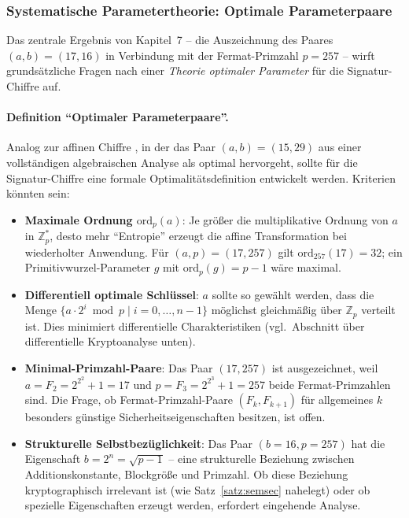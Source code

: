 ﻿\documentclass[a4paper,12pt]{scrreprt}
\theoremstyle{definition}
\begin{document}
\subsubsection{Systematische Parametertheorie: Optimale Parameterpaare}

Das zentrale Ergebnis von Kapitel~7 -- die Auszeichnung des Paares $(a, b) = (17, 16)$ in Verbindung mit der Fermat-Primzahl $p = 257$ -- wirft grundsätzliche Fragen nach einer \emph{Theorie optimaler Parameter} für die Signatur-Chiffre auf.

\paragraph{Definition ``Optimaler Parameterpaare''.}
Analog zur affinen Chiffre \cite{Epp26c}, in der das Paar $(a,b) = (15, 29)$ aus einer vollständigen algebraischen Analyse als optimal hervorgeht, sollte für die Signatur-Chiffre eine formale Optimalitätsdefinition entwickelt werden. Kriterien könnten sein:
\begin{itemize}
  \item \textbf{Maximale Ordnung $\mathrm{ord}_p(a)$}: Je größer die multiplikative Ordnung von $a$ in $\mathbb{Z}_p^*$, desto mehr ``Entropie'' erzeugt die affine Transformation bei wiederholter Anwendung. Für $(a,p) = (17, 257)$ gilt $\mathrm{ord}_{257}(17) = 32$; ein Primitivwurzel-Parameter $g$ mit $\mathrm{ord}_p(g) = p-1$ wäre maximal.
  \item \textbf{Differentiell optimale Schlüssel}: $a$ sollte so gewählt werden, dass die Menge $\{a \cdot 2^i \bmod p \mid i = 0, \ldots, n-1\}$ möglichst gleichmäßig über $\mathbb{Z}_p$ verteilt ist. Dies minimiert differentielle Charakteristiken (vgl.\ Abschnitt über differentielle Kryptoanalyse unten).
  \item \textbf{Minimal-Primzahl-Paare}: Das Paar $(17, 257)$ ist ausgezeichnet, weil $a = F_2 = 2^{2^2} + 1 = 17$ und $p = F_3 = 2^{2^3} + 1 = 257$ beide Fermat-Primzahlen sind. Die Frage, ob Fermat-Primzahl-Paare $(F_k, F_{k+1})$ für allgemeines $k$ besonders günstige Sicherheitseigenschaften besitzen, ist offen.
  \item \textbf{Strukturelle Selbstbezüglichkeit}: Das Paar $(b=16, p=257)$ hat die Eigenschaft $b = 2^n = \sqrt{p-1}$ -- eine strukturelle Beziehung zwischen Additionskonstante, Blockgröße und Primzahl. Ob diese Beziehung kryptographisch irrelevant ist (wie Satz~\ref{satz:semsec} nahelegt) oder ob spezielle Eigenschaften erzeugt werden, erfordert eingehende Analyse.
\end{itemize}
\end{document}
